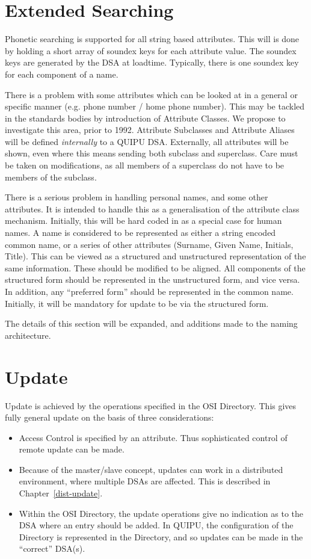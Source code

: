 \section {Extended Searching}

Phonetic searching is supported for all string based attributes.
This will is done by holding a short array of soundex keys for each
attribute value.
The soundex keys are generated by the DSA at loadtime.
Typically, there is  one soundex key for each component of a name.


There is a problem with some attributes which can be looked at in a general
or specific manner (e.g. phone number / home phone number).  This may be
tackled in the standards bodies by introduction of Attribute Classes.
We propose to investigate this area, prior to 1992.  Attribute Subclasses
and Attribute Aliases will be
defined {\em internally} to a QUIPU DSA.  Externally, all attributes will be
shown, even where this means sending both subclass and superclass.
Care must be taken on modifications, as all members of a superclass do not
have to be members of the subclass.

There is a serious problem in handling personal names, and some other
attributes.  It is intended to handle this as a generalisation of the
attribute class mechanism.  Initially, this will be hard coded in as a
special case for human names.  A name is considered to be represented as 
either a string encoded common name, or a series of other attributes
(Surname, Given Name, Initials, Title).  This can be viewed as a structured
and unstructured representation of the same information.  These should be
modified to be aligned.  All components of the structured form should be
represented in the unstructured form, and vice versa.  In addition, any
``preferred form'' should be represented in the common name.  Initially, it
will be mandatory for update to be via the structured form.

The details of this section will be expanded, and additions made to the naming
architecture.

\section {Update}

Update is achieved by the operations specified in the OSI Directory.
This gives fully general update on the basis of three considerations:

\begin {itemize}
\item
Access Control is specified by an attribute.
Thus sophisticated control of remote update can be made.
\item
Because of the master/slave concept, updates can work in a distributed
environment, where multiple DSAs are affected.
This is described in Chapter~\ref{dist-update}.
\item 
Within the OSI Directory, the update operations give no indication as to the DSA
where an entry should be added.
In QUIPU, the 
configuration of the Directory is represented in the Directory, and so
updates can be made in the ``correct'' DSA(s).  
\end {itemize}




